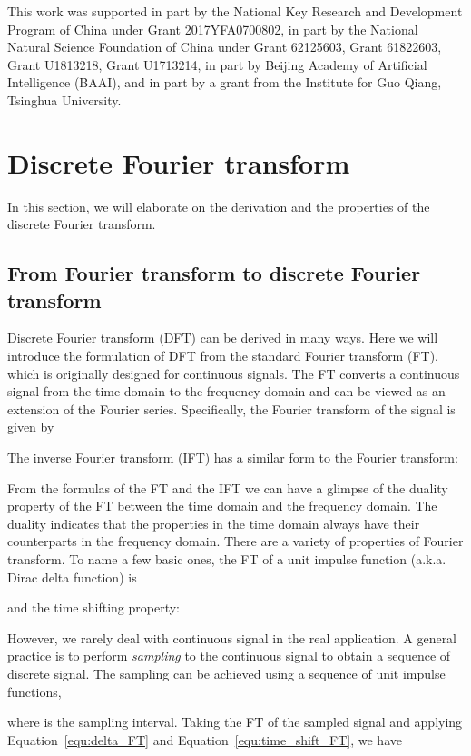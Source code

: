 \documentclass{article}
\numberwithin{equation}{section}
\begin{document}
This work was supported in part by the National Key Research and Development Program of China under Grant 2017YFA0700802, in part by the National Natural Science Foundation of China under Grant 62125603, Grant 61822603, Grant U1813218, Grant U1713214, in part by Beijing Academy of Artificial Intelligence (BAAI), and in part by a grant from the Institute for Guo Qiang, Tsinghua University.




\newpage
\appendix

\section{Discrete Fourier transform}
\label{appendix:DFT}
In this section, we will elaborate on the derivation and the properties of the discrete Fourier transform.
\subsection{From Fourier transform to discrete Fourier transform}

Discrete Fourier transform (DFT) can be derived in many ways. Here we will introduce the formulation of DFT from the standard Fourier transform (FT), which is originally designed for continuous signals. The FT converts a continuous signal from the time domain to the frequency domain and can be viewed as an extension of the Fourier series. Specifically, the Fourier transform of the signal  is given by

The inverse Fourier transform (IFT) has a similar form to the Fourier transform:

From the formulas of the FT and the IFT we can have a glimpse of the duality property of the FT between the time domain and the frequency domain. The duality indicates that the properties in the time domain always have their counterparts in the frequency domain. There are a variety of properties of Fourier transform. To name a few basic ones, the FT of a unit impulse function (a.k.a. Dirac delta function) is

and the time shifting property:

However, we rarely deal with continuous signal in the real application. A general practice is to perform \emph{sampling} to the continuous signal to obtain a sequence of discrete signal. The sampling can be achieved using a sequence of unit impulse functions,

where  is the sampling interval. Taking the FT of the sampled signal  and applying Equation~\eqref{equ:delta_FT} and Equation~\eqref{equ:time_shift_FT}, we have
\end{document}
